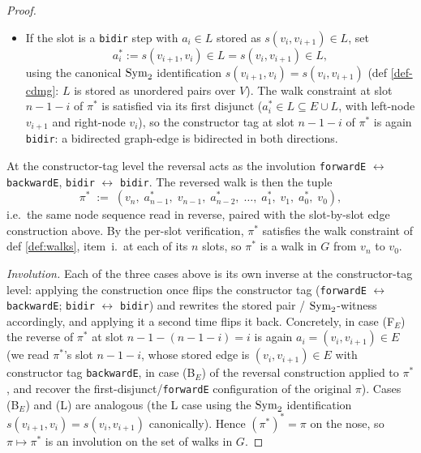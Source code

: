 \documentclass[main]{subfiles}
\begin{document}
\begin{proof}
\begin{itemize}
        \[
            a_i^* := (v_{i+1}, v_i) \in E,
        \]
        the same directed graph-edge, now occupying slot $n - 1 - i$ of $\pi^*$ between $v_{i+1}$ (left) and $v_i$ (right). The walk constraint at slot $n - 1 - i$ of $\pi^*$ is satisfied via its \emph{first} disjunct ($a_i^* = (\text{left-node}, \text{right-node}) = (v_{i+1}, v_i) \in E \subseteq E \cup L$), so the constructor tag at slot $n - 1 - i$ of $\pi^*$ is \texttt{forwardE}: a directed graph-edge traversed backwards on $\pi$ becomes one traversed forwards on $\pi^*$.
    \item[(L)] If the slot is a \texttt{bidir} step with $a_i \in L$ stored as $s(v_i, v_{i+1}) \in L$, set
        \[
            a_i^* := s(v_{i+1}, v_i) \in L = s(v_i, v_{i+1}) \in L,
        \]
        using the canonical $\mathrm{Sym}_2$ identification $s(v_{i+1}, v_i) = s(v_i, v_{i+1})$ (def \ref{def-cdmg}: $L$ is stored as unordered pairs over $V$). The walk constraint at slot $n - 1 - i$ of $\pi^*$ is satisfied via its first disjunct ($a_i^* \in L \subseteq E \cup L$, with left-node $v_{i+1}$ and right-node $v_i$), so the constructor tag at slot $n - 1 - i$ of $\pi^*$ is again \texttt{bidir}: a bidirected graph-edge is bidirected in both directions.
\end{itemize}
At the constructor-tag level the reversal acts as the involution \texttt{forwardE} $\leftrightarrow$ \texttt{backwardE}, \texttt{bidir} $\leftrightarrow$ \texttt{bidir}. The reversed walk is then the tuple
\[
    \pi^* \;:=\; (v_n, \; a_{n-1}^*, \; v_{n-1}, \; a_{n-2}^*, \; \dots, \; a_1^*, \; v_1, \; a_0^*, \; v_0),
\]
i.e.\ the same node sequence read in reverse, paired with the slot-by-slot edge construction above. By the per-slot verification, $\pi^*$ satisfies the walk constraint of def \ref{def:walks}, item~i.\ at each of its $n$ slots, so $\pi^*$ is a walk in $G$ from $v_n$ to $v_0$.

\smallskip\noindent\emph{Involution.}
Each of the three cases above is its own inverse at the constructor-tag level: applying the construction once flips the constructor tag (\texttt{forwardE} $\leftrightarrow$ \texttt{backwardE}; \texttt{bidir} $\leftrightarrow$ \texttt{bidir}) and rewrites the stored pair / $\mathrm{Sym}_2$-witness accordingly, and applying it a second time flips it back. Concretely, in case (F$_E$) the reverse of $\pi^*$ at slot $n - 1 - (n - 1 - i) = i$ is again $a_i = (v_i, v_{i+1}) \in E$ (we read $\pi^*$'s slot $n - 1 - i$, whose stored edge is $(v_i, v_{i+1}) \in E$ with constructor tag \texttt{backwardE}, in case (B$_E$) of the reversal construction applied to $\pi^*$, and recover the first-disjunct/\texttt{forwardE} configuration of the original $\pi$). Cases (B$_E$) and (L) are analogous (the L case using the $\mathrm{Sym}_2$ identification $s(v_{i+1}, v_i) = s(v_i, v_{i+1})$ canonically). Hence $(\pi^*)^* = \pi$ on the nose, so $\pi \mapsto \pi^*$ is an involution on the set of walks in $G$.


\end{proof}
\end{document}
